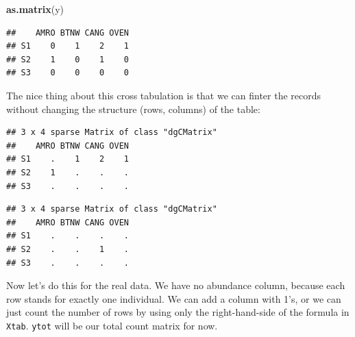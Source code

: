 \documentclass[12pt,]{book}
\newenvironment{Shaded}{\begin{snugshade}}{\end{snugshade}}
\newcommand{\KeywordTok}[1]{\textcolor[rgb]{0.13,0.29,0.53}{\textbf{#1}}}
\newcommand{\NormalTok}[1]{#1}
\newcommand{\OperatorTok}[1]{\textcolor[rgb]{0.81,0.36,0.00}{\textbf{#1}}}
\newcommand{\StringTok}[1]{\textcolor[rgb]{0.31,0.60,0.02}{#1}}
\begin{document}
\begin{Shaded}
\begin{Highlighting}[]
\KeywordTok{as.matrix}\NormalTok{(y)}
\end{Highlighting}
\end{Shaded}

\begin{verbatim}
##    AMRO BTNW CANG OVEN
## S1    0    1    2    1
## S2    1    0    1    0
## S3    0    0    0    0
\end{verbatim}

The nice thing about this cross tabulation is that we can finter the records without
changing the structure (rows, columns) of the table:

\begin{Shaded}
\end{Shaded}

\begin{verbatim}
## 3 x 4 sparse Matrix of class "dgCMatrix"
##    AMRO BTNW CANG OVEN
## S1    .    1    2    1
## S2    1    .    .    .
## S3    .    .    .    .
\end{verbatim}

\begin{Shaded}
\end{Shaded}

\begin{verbatim}
## 3 x 4 sparse Matrix of class "dgCMatrix"
##    AMRO BTNW CANG OVEN
## S1    .    .    .    .
## S2    .    .    1    .
## S3    .    .    .    .
\end{verbatim}

Now let's do this for the real data. We have no abundance column, because
each row stands for exactly one individual. We can add a column with 1's,
or we can just count the number of rows by using only the right-hand-side of the
formula in \texttt{Xtab}. \texttt{ytot} will be our total count matrix for now.
\end{document}

